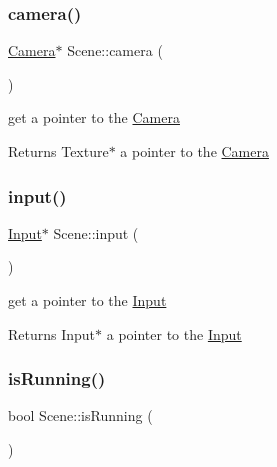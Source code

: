 \subsubsection{\texorpdfstring{camera()}{camera()}}
{\footnotesize\ttfamily \hyperlink{class_camera}{Camera}$\ast$ Scene\+::camera (\begin{DoxyParamCaption}{ }\end{DoxyParamCaption})\hspace{0.3cm}{\ttfamily [inline]}}



get a pointer to the \hyperlink{class_camera}{Camera} 

\begin{DoxyReturn}{Returns}
Texture$\ast$ a pointer to the \hyperlink{class_camera}{Camera} 
\end{DoxyReturn}
\mbox{\label{class_scene_ab8f8ccda2e6a954deb81d0f58c3b88bd}} 
\subsubsection{\texorpdfstring{input()}{input()}}
{\footnotesize\ttfamily \hyperlink{class_input}{Input}$\ast$ Scene\+::input (\begin{DoxyParamCaption}{ }\end{DoxyParamCaption})\hspace{0.3cm}{\ttfamily [inline]}}



get a pointer to the \hyperlink{class_input}{Input} 

\begin{DoxyReturn}{Returns}
Input$\ast$ a pointer to the \hyperlink{class_input}{Input} 
\end{DoxyReturn}
\mbox{\label{class_scene_af6673f416884a66f46fd1e703d77de03}} 
\subsubsection{\texorpdfstring{is\+Running()}{isRunning()}}
{\footnotesize\ttfamily bool Scene\+::is\+Running (\begin{DoxyParamCaption}{ }\end{DoxyParamCaption})\hspace{0.3cm}{\ttfamily [inline]}}




